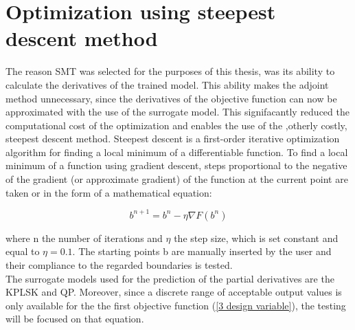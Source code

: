\chapter{Optimization using steepest descent method}
The reason SMT was selected for the purposes
of this thesis, was its ability to calculate
the derivatives of the trained  model. This 
ability makes the adjoint method 
unnecessary, since  the derivatives of
the objective function can now be 
approximated with the use of the surrogate 
model. This signifacantly reduced the 
computational cost of the optimization and 
enables the use of the ,otherly costly, 
steepest descent method. Steepest descent
is a first-order iterative optimization 
algorithm for finding a local minimum of a 
differentiable function. To find a local 
minimum of a function using gradient descent, 
steps proportional to the negative of 
the gradient (or approximate gradient) of the 
function at the current point are taken or in the form of 
a mathematical equation:

\begin{equation}\label{steepest descent}
	b^{n+1} = b^n - \eta \nabla F(b^n)
\end{equation}

where n the number of iterations and $\eta$ 
the step size, which is set constant
and equal to $\eta = 0.1$. The starting 
points b are manually inserted by the user 
and their compliance to the regarded 
boundaries is tested.
\\
  
The surrogate models used for the 
prediction of the partial derivatives are the 
KPLSK and QP. Moreover, since a discrete 
range of acceptable output values is only 
available for the the first objective 
function (\ref{3 design variable}), the 
testing will be focused on that 
equation.
\newpage

